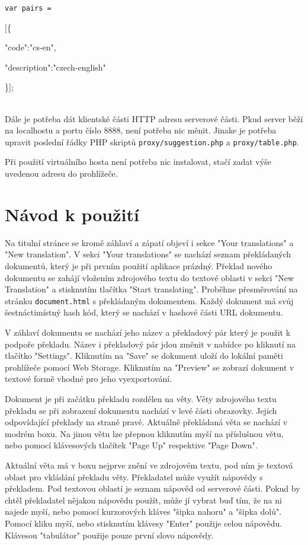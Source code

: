 \documentclass[12pt,a4paper]{report}
\begin{document}
{\tt var pairs =

[\{

"code":"cs-en",

"description":"czech-english"

\}]; } \\

Dále je potřeba dát klientské části HTTP adresu serverové části. Pkud server běží na localhostu a portu číslo 8888, není potřeba nic měnit. Jinake je potřeba upravit poslední řádky PHP skriptů {\tt proxy/suggestion.php} a {\tt proxy/table.php}.

Při použití virtuálního hosta není potřeba nic instalovat, stačí zadat výše uvedenou adresu do prohlížeče.

\section{Návod k použití}
Na titulní stránce se kromě záhlaví a zápatí objeví i sekce "Your translations" a "New translation". V sekci "Your translations" se nachází seznam překládaných dokumentů, který je při prvním použití aplikace prázdný. Překlad nového dokumentu se zahájí vložením zdrojového textu do textové oblasti v sekci "New Translation" a stisknutím tlačítka "Start translating". Proběhne přesměrování na stránku {\tt document.html} s překládaným dokumentem. Každý dokument má svůj šestnáctimístný hash kód, který se nachází v hashové části URL dokumentu.

V záhlaví dokumentu se nachází jeho název a překladový pár který je použit k podpoře překladu. Název i překladový pár jdou změnit v nabídce po kliknutí na tlačítko "Settings". Kliknutím na "Save" se dokument uloží do lokální paměti prohlížeče pomocí Web Storage. Kliknutím na "Preview" se zobrazí dokument v textové formě vhodné pro jeho vyexportování.

Dokument je při začátku překladu rozdělen na věty. Věty zdrojového textu překladu se při zobrazení dokumentu nachází v levé části obrazovky. Jejich odpovídající překlady na straně pravé. Aktuálně překládaná věta se nachází v modrém boxu. Na jinou větu lze přepnou kliknutím myší na příslušnou větu, nebo pomocí klávesových tlačítek "Page Up" respektive "Page Down".

Aktuální věta má v boxu nejprve znění ve zdrojovém textu, pod ním je textová oblast pro vkládání překladu věty. Překladatel může využít nápovědy s překladem. Pod textovou oblastí je seznam nápověd od serverové části. Pokud by chtěl překladatel nějakou nápovědu použít, může jí vybrat buď tím, že na ni najede myší, nebo pomocí kurzorových kláves "šipka nahoru" a "šipka dolů". Pomocí kliku myší, nebo stisknutím klávesy "Enter" použije celou nápovědu. Klávesou "tabulátor" použije pouze první slovo nápovědy. 
\end{document}
